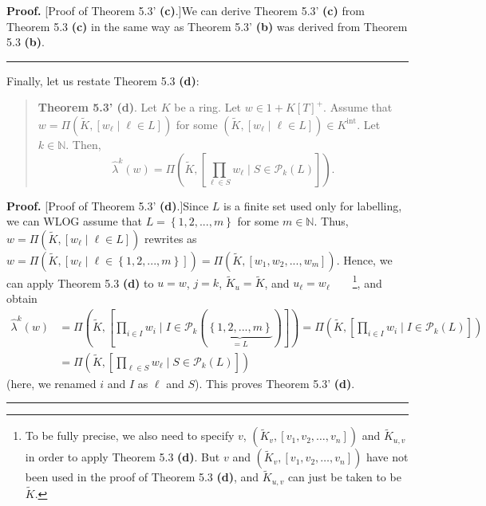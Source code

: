\documentclass[numbers=enddot,12pt,final,onecolumn,notitlepage]{scrartcl}%
\newenvironment{proof}[1][Proof]{\noindent\textbf{#1.} }{\ \rule{0.5em}{0.5em}}
\begin{document}
\begin{proof}
[Proof of Theorem 5.3' \textbf{(c)}.]We can derive Theorem 5.3' \textbf{(c)}
from Theorem 5.3 \textbf{(c)} in the same way as Theorem 5.3' \textbf{(b)} was
derived from Theorem 5.3 \textbf{(b)}.
\end{proof}

Finally, let us restate Theorem 5.3 \textbf{(d)}:

\begin{quote}
\textbf{Theorem 5.3' (d)}. Let $K$ be a ring. Let $w\in1+K\left[  T\right]
^{+}$. Assume that $w=\Pi\left(  \widetilde{K},\left[  w_{\ell}\mid\ell\in
L\right]  \right)  $ for some $\left(  \widetilde{K},\left[  w_{\ell}\mid
\ell\in L\right]  \right)  \in K^{\operatorname*{int}}$. Let $k\in\mathbb{N}$.
Then,%
\[
\widehat{\lambda}^{k}\left(  w\right)  =\Pi\left(  \widetilde{K},\left[
\prod_{\ell\in S}w_{\ell}\mid S\in\mathcal{P}_{k}\left(  L\right)  \right]
\right)  .
\]



\end{quote}

\begin{proof}
[Proof of Theorem 5.3' \textbf{(d)}.]Since $L$ is a finite set used only for
labelling, we can WLOG assume that $L=\left\{  1,2,...,m\right\}  $ for some
$m\in\mathbb{N}$. Thus, $w=\Pi\left(  \widetilde{K},\left[  w_{\ell}\mid
\ell\in L\right]  \right)  $ rewrites as $w=\Pi\left(  \widetilde{K},\left[
w_{\ell}\mid\ell\in\left\{  1,2,...,m\right\}  \right]  \right)  =\Pi\left(
\widetilde{K},\left[  w_{1},w_{2},...,w_{m}\right]  \right)  $. Hence, we can
apply Theorem 5.3 \textbf{(d)} to $u=w$, $j=k$, $\widetilde{K}_{u}%
=\widetilde{K}$, and $u_{\ell}=w_{\ell}$\ \ \ \ \footnote{To be fully precise,
we also need to specify $v$, $\left(  \widetilde{K}_{v},\left[  v_{1}%
,v_{2},\ldots,v_{n}\right]  \right)  $ and $\widetilde{K}_{u,v}$ in order to
apply Theorem 5.3 \textbf{(d)}. But $v$ and $\left(  \widetilde{K}_{v},\left[
v_{1},v_{2},\ldots,v_{n}\right]  \right)  $ have not been used in the proof of
Theorem 5.3 \textbf{(d)}, and $\widetilde{K}_{u,v}$ can just be taken to be
$\widetilde{K}$.}, and obtain%
\begin{align*}
\widehat{\lambda}^{k}\left(  w\right)   &  =\Pi\left(  \widetilde{K},\left[
\prod_{i\in I}w_{i}\mid I\in\mathcal{P}_{k}\left(  \underbrace{\left\{
1,2,...,m\right\}  }_{=L}\right)  \right]  \right)  =\Pi\left(  \widetilde{K}%
,\left[  \prod_{i\in I}w_{i}\mid I\in\mathcal{P}_{k}\left(  L\right)  \right]
\right) \\
&  =\Pi\left(  \widetilde{K},\left[  \prod_{\ell\in S}w_{\ell}\mid
S\in\mathcal{P}_{k}\left(  L\right)  \right]  \right)
\end{align*}
(here, we renamed $i$ and $I$ as $\ell$ and $S$). This proves Theorem 5.3'
\textbf{(d)}.
\end{proof}
\end{document}
